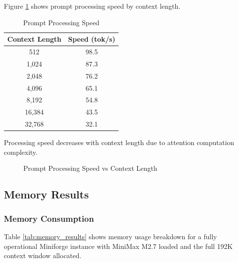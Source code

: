 Figure \ref{fig:prompt_processing} shows prompt processing speed by context length.

\begin{table}[h]
\centering
\caption{Prompt Processing Speed}
\label{tab:prompt_processing}
\begin{tabular}{cc}
\toprule
\textbf{Context Length} & \textbf{Speed (tok/s)} \\
\midrule
512 & 98.5 \\
1,024 & 87.3 \\
2,048 & 76.2 \\
4,096 & 65.1 \\
8,192 & 54.8 \\
16,384 & 43.5 \\
32,768 & 32.1 \\
\bottomrule
\end{tabular}
\end{table}

Processing speed decreases with context length due to attention computation complexity.

\begin{figure}[h]
\centering
{}
\caption{Prompt Processing Speed vs Context Length}
\label{fig:prompt_processing}
\end{figure}

\subsection{Memory Results}

\subsubsection{Memory Consumption}

Table \ref{tab:memory_results} shows memory usage breakdown for a fully operational Miniforge instance with MiniMax M2.7 loaded and the full 192K context window allocated.

